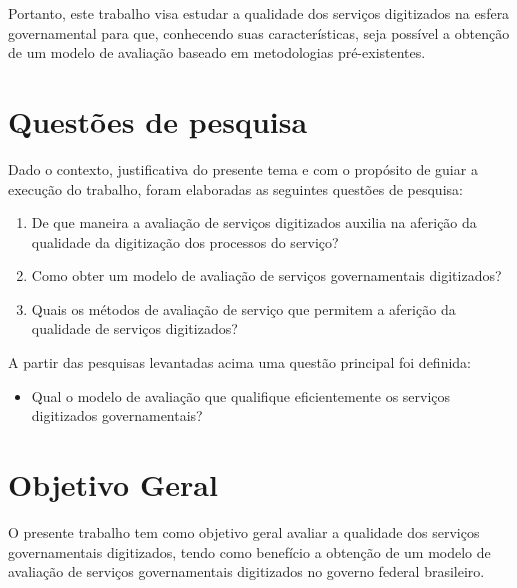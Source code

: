 Portanto, este trabalho visa estudar a qualidade dos serviços digitizados na esfera governamental para que, conhecendo suas características, seja possível a obtenção de um modelo de avaliação baseado em metodologias pré-existentes. 


\section{Questões de pesquisa}

Dado o contexto, justificativa do presente tema e com o propósito de guiar a execução do trabalho, foram elaboradas as seguintes questões de pesquisa:
\begin{enumerate}
	\item De que maneira a avaliação de serviços digitizados auxilia na aferição da qualidade da digitização dos processos do serviço?

	\item Como obter um modelo de avaliação de serviços governamentais digitizados?

	\item Quais os métodos de avaliação de serviço que permitem a aferição da qualidade de serviços digitizados?
\end{enumerate}

A partir das pesquisas levantadas acima uma questão principal foi definida:

\begin{itemize}
	\item Qual o modelo de avaliação que qualifique eficientemente os serviços digitizados governamentais?
\end{itemize}

\section{Objetivo Geral}
	O presente trabalho tem como objetivo geral avaliar a qualidade dos serviços governamentais digitizados, tendo como benefício a obtenção de um modelo de avaliação de serviços governamentais digitizados no governo federal brasileiro.